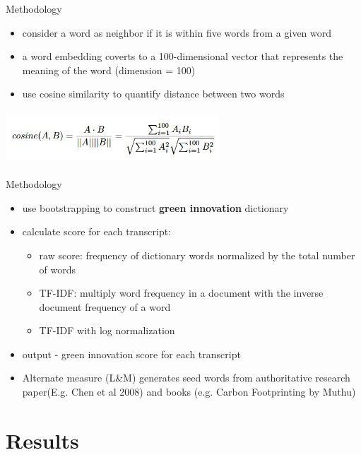 \documentclass[cjk,usenames,dvipsnames]{beamer}
\begin{document}
\begin{frame}{Methodology}


  \begin{itemize}

    \item consider a word as neighbor if it is within five words from a given word 
    \item a word embedding coverts to a 100-dimensional vector that represents the meaning of the word (dimension = 100)
    \item use cosine similarity to quantify distance between two words 
         \end{itemize}
        
  \includegraphics[height=2cm, width=8cm]{cosine.png}

\end{frame}

\begin{frame}{Methodology}

  \begin{itemize}

    \item use bootstrapping to construct \textbf{green innovation} dictionary 
    \item calculate score for each transcript:
    \begin{itemize}
        \item raw score: frequency of dictionary words normalized by the total number of words
        \item TF-IDF: multiply word frequency in a document with the inverse document frequency of a word 
        \item TF-IDF with log normalization
    \end{itemize}
    \item output - green innovation score for each transcript 
    \item Alternate measure (L\&M) generates seed words from authoritative research paper(E.g. Chen et al 2008) and books (e.g. Carbon Footprinting by Muthu)
         \end{itemize}
\end{frame}

\section{Results}
\end{document}
